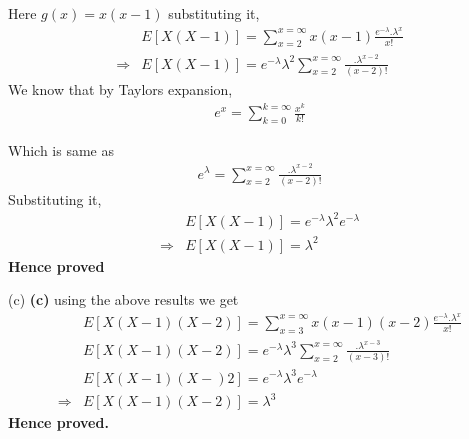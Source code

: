 \documentclass{beamer}
\begin{document}
    \begin{frame}
        Here $g(x)=x(x-1)$ substituting it,
\begin{align}
    &E[X(X-1)]=\sum^{x=\infty}_{x=2}x(x-1)\frac{e^{-\lambda}.\lambda^{x}}{x!} \\
    \Rightarrow &E[X(X-1)]=e^{-\lambda}\lambda^{2}\sum^{x=\infty}_{x=2}\frac{.\lambda^{x-2}}{(x-2)!}
\end{align}
We know that by Taylors expansion,
\begin{align}
    e^{x}=\sum^{k=\infty}_{k=0}\frac{x^{k}}{k!}
\end{align}
\end{frame}
\begin{frame}
Which is same as 
\begin{align}
    e^{\lambda}=\sum^{x=\infty}_{x=2}\frac{.\lambda^{x-2}}{(x-2)!}
\end{align}
Substituting it,
\begin{align}
    &E[X(X-1)]=e^{-\lambda}\lambda^{2}e^{-\lambda}\\
    \Rightarrow&E[X(X-1)]=\lambda^{2}
\end{align}
\textbf{Hence proved}
    \end{frame}
    \begin{frame}{(c)}
    \textbf{(c)}  using the above results we get
\begin{align}
&E[X(X-1)(X-2)]=\sum^{x=\infty}_{x=3}x(x-1)(x-2)\frac{e^{-\lambda}.\lambda^{x}}{x!}\\
 &E[X(X-1)(X-2)]=e^{-\lambda}\lambda^{3}\sum^{x=\infty}_{x=2}\frac{.\lambda^{x-3}}{(x-3)!}\\
 &E[X(X-1)(X-)2]=e^{-\lambda}\lambda^{3}e^{-\lambda}\\
 \Rightarrow&E[X(X-1)(X-2)]=\lambda^{3}
\end{align}
    \textbf{Hence proved.}
    \end{frame}
     
     
\end{document}
